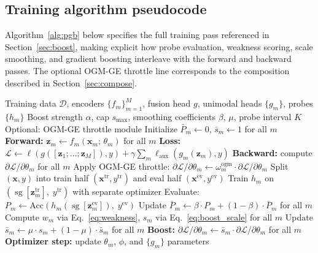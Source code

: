 \documentclass{article} %
\newcommand{\loss}{\mathcal{L}}
\newcommand{\encoder}{f}
\newcommand{\probe}{h}
\newcommand{\sg}{\operatorname{sg}}
\begin{document}
\subsection{Training algorithm pseudocode}
\label{app:algorithm}

Algorithm~\ref{alg:pgb} below specifies the full training pass referenced in Section~\ref{sec:boost}, making explicit how probe evaluation, weakness scoring, scale smoothing, and gradient boosting interleave with the forward and backward passes. The optional OGM-GE throttle line corresponds to the composition described in Section~\ref{sec:compose}.

\begin{algorithm}[H]
\caption{Probe-Guided Gradient Boosting (full training pass over $\mathcal{D}$). Notation: $P_m$ per-batch probe accuracy with smoothed estimate $\bar{P}_m$; $\phi$ fusion-head parameters; $\sg[\cdot]$ stop-gradient operator (\S\ref{sec:probes}). Auxiliary-loss weight $\gamma$ and optional OGM-GE throttle $\omega_m^{\text{ogm}} \leq 1$ are introduced in \S\ref{sec:compose}.}
\label{alg:pgb}
\begin{algorithmic}[1]
\REQUIRE Training data $\mathcal{D}$, encoders $\{\encoder_m\}_{m=1}^M$, fusion head $g$, unimodal heads $\{g_m\}$, probes $\{\probe_m\}$
\REQUIRE Boost strength $\alpha$, cap $s_{\max}$, smoothing coefficients $\beta$, $\mu$, probe interval $K$
\REQUIRE Optional: OGM-GE throttle module
\STATE Initialize $\bar{P}_m \leftarrow 0$, $\bar{s}_m \leftarrow 1$ for all $m$
    \STATE \textbf{Forward:} $\mathbf{z}_m \leftarrow \encoder_m(\mathbf{x}_m;\,\theta_m)$ for all $m$
    \STATE \textbf{Loss:} $\loss \leftarrow \ell(g([\mathbf{z}_1;\ldots;\mathbf{z}_M]), y) + \gamma \sum_m \ell_{\text{aux}}(g_m(\mathbf{z}_m), y)$
    \STATE \textbf{Backward:} compute $\partial\loss/\partial\theta_m$ for all $m$
        \STATE Apply OGM-GE throttle: $\partial\loss/\partial\theta_m \leftarrow \omega_m^{\text{ogm}} \cdot \partial\loss/\partial\theta_m$
    \ENDIF
        \STATE Split $(\mathbf{x}, y)$ into train half $(\mathbf{x}^{\text{tr}}, y^{\text{tr}})$ and eval half $(\mathbf{x}^{\text{ev}}, y^{\text{ev}})$
            \STATE Train $\probe_m$ on $(\sg[\mathbf{z}_m^{\text{tr}}],\; y^{\text{tr}})$ with separate optimizer
            \STATE Evaluate: $P_m \leftarrow \text{Acc}(\probe_m(\sg[\mathbf{z}_m^{\text{ev}}]),\; y^{\text{ev}})$
        \ENDFOR
        \STATE Update $\bar{P}_m \leftarrow \beta \cdot P_m + (1-\beta) \cdot \bar{P}_m$ for all $m$
        \STATE Compute $w_m$ via Eq.~\eqref{eq:weakness}, $s_m$ via Eq.~\eqref{eq:boost_scale} for all $m$
        \STATE Update $\bar{s}_m \leftarrow \mu \cdot s_m + (1-\mu) \cdot \bar{s}_m$ for all $m$
    \ENDIF
    \STATE \textbf{Boost:} $\partial\loss/\partial\theta_m \leftarrow \bar{s}_m \cdot \partial\loss/\partial\theta_m$ for all $m$
    \STATE \textbf{Optimizer step:} update $\theta_m$, $\phi$, and $\{g_m\}$ parameters
\ENDFOR
\end{algorithmic}
\end{algorithm}
\end{document}
